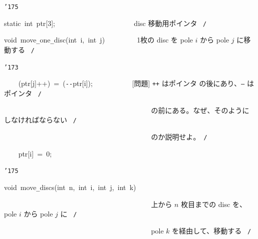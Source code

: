 \documentclass{article}
\begin{document}
\noindent
\mbox{}{\tt\char'175}

\noindent
\mbox{}\hfill

\noindent
\mbox{}static{\tt\mc \ }int{\tt\mc \ }{\tt *}ptr[3];{\tt\mc \ \ \ \ \ }{\tt\mc \ \ \ \ \ \ \ \ }{\tt\mc \ \ \ \ \ \ \ \ }\rm\mc {\tt /}{\tt *}\  {}disc 移動用ポインタ \hfill \rm\mc \ {\tt *}{\tt /}
\tt\mc 

\noindent
\mbox{}\hfill

\noindent
\mbox{}void{\tt\mc \ }move{\tt\_}one{\tt\_}disc(int{\tt\mc \ }i,{\tt\mc \ }int{\tt\mc \ }j){\tt\mc \ \ \ \ \ \ \ \ }\rm\mc {\tt /}{\tt *}\  {}1枚の disc を pole $i$ から
					   pole $j$ に移動する \hfill \rm\mc \ {\tt *}{\tt /}
\tt\mc 

\noindent
\mbox{}{\tt\char'173}

\noindent
\mbox{}{\tt\mc \ \ \ \ }({\tt *}ptr[j]++){\tt\mc \ }={\tt\mc \ }({\tt *}{\tt -}{\tt -}ptr[i]);{\tt\mc \ \ }{\tt\mc \ \ \ \ \ \ \ \ }\rm\mc {\tt /}{\tt *}\  {}[問題] {\tt ++} はポインタ
					   の後にあり、{\tt --} はポインタ
					   \hfill \rm\mc \ {\tt *}{\tt /}
\tt\mc 

\noindent
\mbox{}{\tt\mc \ \ \ \ \ \ \ \ }{\tt\mc \ \ \ \ \ \ \ \ }{\tt\mc \ \ \ \ \ \ \ \ }{\tt\mc \ \ \ \ \ \ \ \ }{\tt\mc \ \ \ \ \ \ \ \ }\rm\mc {\tt /}{\tt *}\  {}の前にある。なぜ、そのように
					   しなければならない \hfill \rm\mc \ {\tt *}{\tt /}
\tt\mc 

\noindent
\mbox{}{\tt\mc \ \ \ \ \ \ \ \ }{\tt\mc \ \ \ \ \ \ \ \ }{\tt\mc \ \ \ \ \ \ \ \ }{\tt\mc \ \ \ \ \ \ \ \ }{\tt\mc \ \ \ \ \ \ \ \ }\rm\mc {\tt /}{\tt *}\  {}のか説明せよ。\hfill \rm\mc \ {\tt *}{\tt /}
\tt\mc 

\noindent
\mbox{}{\tt\mc \ \ \ \ }{\tt *}ptr[i]{\tt\mc \ }={\tt\mc \ }0;

\noindent
\mbox{}{\tt\char'175}

\noindent
\mbox{}\hfill

\noindent
\mbox{}void{\tt\mc \ }move{\tt\_}discs(int{\tt\mc \ }n,{\tt\mc \ }int{\tt\mc \ }i,{\tt\mc \ }int{\tt\mc \ }j,{\tt\mc \ }int{\tt\mc \ }k)

\noindent
\mbox{}{\tt\mc \ \ \ \ \ \ \ \ }{\tt\mc \ \ \ \ \ \ \ \ }{\tt\mc \ \ \ \ \ \ \ \ }{\tt\mc \ \ \ \ \ \ \ \ }{\tt\mc \ \ \ \ \ \ \ \ }\rm\mc {\tt /}{\tt *}\  {}上から $n$ 枚目までの disc
					   を、pole $i$ から pole $j$ に
					   \hfill \rm\mc \ {\tt *}{\tt /}
\tt\mc 

\noindent
\mbox{}{\tt\mc \ \ \ \ \ \ \ \ }{\tt\mc \ \ \ \ \ \ \ \ }{\tt\mc \ \ \ \ \ \ \ \ }{\tt\mc \ \ \ \ \ \ \ \ }{\tt\mc \ \ \ \ \ \ \ \ }\rm\mc {\tt /}{\tt *}\  {}pole $k$ を経由して、移動する
					   \hfill \rm\mc \ {\tt *}{\tt /}
\tt\mc 
\end{document}
